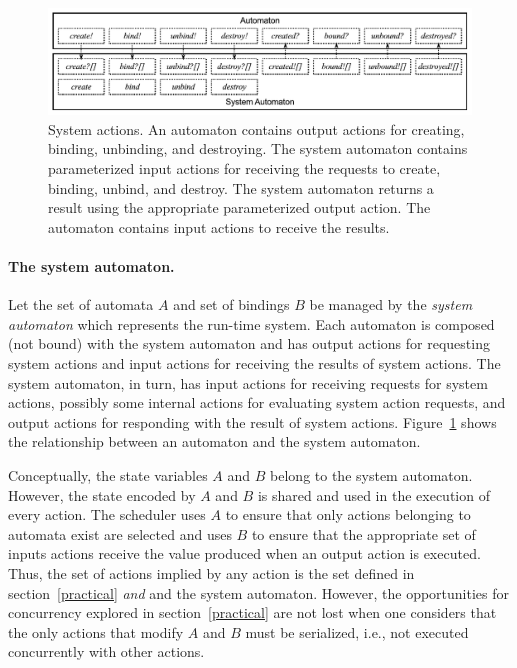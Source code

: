 
\begin{figure}
\center
\includegraphics[width=\textwidth]{system_action}
\caption{System actions.
  An automaton contains output actions for creating, binding, unbinding, and destroying.
  The system automaton contains parameterized input actions for receiving the requests to create, binding, unbind, and destroy.
  The system automaton returns a result using the appropriate parameterized output action.
  The automaton contains input actions to receive the results.}
\label{system_action}
\end{figure}

\paragraph{The system automaton.}
Let the set of automata $A$ and set of bindings $B$ be managed by the \emph{system automaton} which represents the run-time system.
Each automaton is composed (not bound) with the system automaton and has output actions for requesting system actions and input actions for receiving the results of system actions.
The system automaton, in turn, has input actions for receiving requests for system actions, possibly some internal actions for evaluating system action requests, and output actions for responding with the result of system actions.
Figure~\ref{system_action} shows the relationship between an automaton and the system automaton.

Conceptually, the state variables $A$ and $B$ belong to the system automaton.
However, the state encoded by $A$ and $B$ is shared and used in the execution of every action.
The scheduler uses $A$ to ensure that only actions belonging to automata exist are selected and uses $B$ to ensure that the appropriate set of inputs actions receive the value produced when an output action is executed.
Thus, the set of actions implied by any action is the set defined in section~\ref{practical} \emph{and} and the system automaton.
However, the opportunities for concurrency explored in section~\ref{practical} are not lost when one considers that the only actions that modify $A$ and $B$ must be serialized, i.e., not executed concurrently with other actions.

